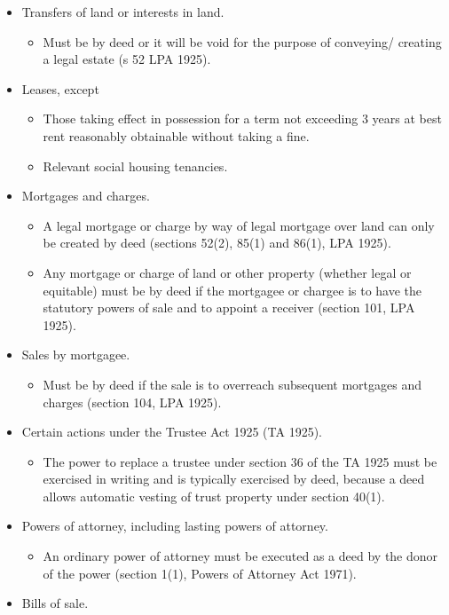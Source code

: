\documentclass[
]{article}
\providecommand{\tightlist}{%
  \setlength{\itemsep}{0pt}\setlength{\parskip}{0pt}}
\begin{document}
\begin{itemize}
\tightlist
\item
  Transfers of land or interests in land.

  \begin{itemize}
  \tightlist
  \item
    Must be by deed or it will be void for the purpose of conveying/
    creating a legal estate (s 52 LPA 1925).
  \end{itemize}
\item
  Leases, except

  \begin{itemize}
  \tightlist
  \item
    Those taking effect in possession for a term not exceeding 3 years
    at best rent reasonably obtainable without taking a fine.
  \item
    Relevant social housing tenancies.
  \end{itemize}
\item
  Mortgages and charges.

  \begin{itemize}
  \tightlist
  \item
    A legal mortgage or charge by way of legal mortgage over land can
    only be created by deed (sections 52(2), 85(1) and 86(1), LPA 1925).
  \item
    Any mortgage or charge of land or other property (whether legal or
    equitable) must be by deed if the mortgagee or chargee is to have
    the statutory powers of sale and to appoint a receiver (section 101,
    LPA 1925).
  \end{itemize}
\item
  Sales by mortgagee.

  \begin{itemize}
  \tightlist
  \item
    Must be by deed if the sale is to overreach subsequent mortgages and
    charges (section 104, LPA 1925).
  \end{itemize}
\item
  Certain actions under the Trustee Act 1925 (TA 1925).

  \begin{itemize}
  \tightlist
  \item
    The power to replace a trustee under section 36 of the TA 1925 must
    be exercised in writing and is typically exercised by deed, because
    a deed allows automatic vesting of trust property under section
    40(1).
  \end{itemize}
\item
  Powers of attorney, including lasting powers of attorney.

  \begin{itemize}
  \tightlist
  \item
    An ordinary power of attorney must be executed as a deed by the
    donor of the power (section 1(1), Powers of Attorney Act 1971).
  \end{itemize}
\item
  Bills of sale.
\end{itemize}
\end{document}
